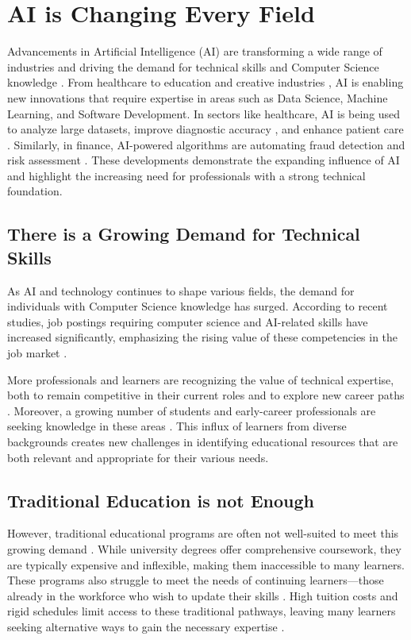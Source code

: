 \section{AI is Changing Every Field} 

Advancements in Artificial Intelligence (AI) are transforming a wide range of industries \cite{noauthor_ai_2023} and driving the demand for technical skills and Computer Science knowledge \cite{noauthor_reskilling_nodate}. From healthcare \cite{saxena_ai_2001} to education \cite{luckin_intelligence_2016} and creative industries \cite{noauthor_pdf_nodate}, AI is enabling new innovations that require expertise in areas such as Data Science, Machine Learning, and Software Development. In sectors like healthcare, AI is being used to analyze large datasets, improve diagnostic accuracy \cite{lenharo_ai_2023}, and enhance patient care \cite{khorsand_ai_2024}. Similarly, in finance, AI-powered algorithms are automating fraud detection and risk assessment \cite{noauthor_pdf_nodate}. These developments demonstrate the expanding influence of AI and highlight the increasing need for professionals with a strong technical foundation.

\subsection{There is a Growing Demand for Technical Skills}

As AI and technology continues to shape various fields, the demand for individuals with Computer Science knowledge has surged. According to recent studies, job postings requiring computer science and AI-related skills have increased significantly, emphasizing the rising value of these competencies in the job market \cite{noauthor_computer_nodate} \cite{noauthor_future_nodate}. 

More professionals and learners are recognizing the value of technical expertise, both to remain competitive in their current roles and to explore new career paths \cite{abe_future_2021}. Moreover, a growing number of students and early-career professionals are seeking knowledge in these areas \cite{noauthor_how_nodate}. This influx of learners from diverse backgrounds creates new challenges in identifying educational resources that are both relevant and appropriate for their various needs.

\subsection{Traditional Education is not Enough }
However, traditional educational programs are often not well-suited to meet this growing demand \cite{noauthor_opinion_nodate}. While university degrees offer comprehensive coursework, they are typically expensive and inflexible, making them inaccessible to many learners. These programs also struggle to meet the needs of continuing learners—those already in the workforce who wish to update their skills \cite{noauthor_lifelong_nodate}. High tuition costs and rigid schedules limit access to these traditional pathways, leaving many learners seeking alternative ways to gain the necessary expertise \cite{noauthor_college_nodate}.

